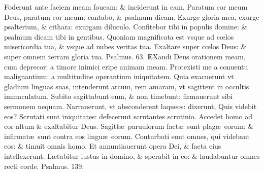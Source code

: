 \documentclass[a5paper,10pt]{book}
\def\ae{æ}
\def\oe{œ}
\begin{document}
\begin{multicols*}{2}
\newline \color{red} F\color{black}oderunt ante faciem meam foueam: \& inciderunt in eam.
\newline \color{red} P\color{black}aratum cor meum Deus, paratum cor meum: cantabo, \& psalmum dicam.
\newline \color{red} E\color{black}xurge gloria mea, exurge psalterium, \& cithara: exurgam diluculo.
\newline \color{red} C\color{black}onfitebor tibi in populis domine: \& psalmum dicam tibi in gentibus.
\newline \color{red} Q\color{black}uoniam magnificata est vsque ad c\oe los misericordia tua, \& vsque ad nubes veritas tua.
\newline \color{red} E\color{black}xaltare super c\oe los Deus: \& super omnem terram gloria tua. \color{red} Psalmus. \hypertarget{ps63}{63.} \color{black}
\vspace{-1.5em}
\lettrine[lines=2]{\bfseries \color{red} E}{}Xaudi Deus orationem meam, cum deprecor: a timore inimici eripe animam meam.
\newline \color{red} P\color{black}rotexisti me a conuentu malignantium: a multitudine operantium iniquitatem.
\newline \color{red} Q\color{black}uia exacuerunt vt gladium linguas suas, intenderunt arcum, rem amaram, vt sagittent in occultis immaculatum.
\newline \color{red} S\color{black}ubito sagittabunt eum, \& non timebunt: firmauerunt sibi sermonem nequam.
\newline \color{red} N\color{black}arrauerunt, vt absconderent laqueos: dixerunt, Quis videbit eos?
\newline \color{red} S\color{black}crutati sunt iniquitates: defecerunt scrutantes scrutinio.
\newline \color{red} A\color{black}ccedet homo ad cor altum \& exaltabitur Deus.
\newline \color{red} S\color{black}agitt\ae \ paruulorum fact\ae \ sunt plag\ae \ eorum: \& infirmat\ae \ sunt contra eos lingu\ae \ eorum.
\newline \color{red} C\color{black}onturbati sunt omnes, qui videbant eos: \& timuit omnis homo.
\newline \color{red} E\color{black}t annuntiauerunt opera Dei, \& facta eius intellexerunt.
\newline \color{red} L\color{black}\ae tabitur iustus in domino, \& sperabit in eo: \& laudabuntur omnes recti corde. \quad \color{red} Psalmus. \hypertarget{ps139}{139.} \color{black}

\end{multicols*}
\end{document}
